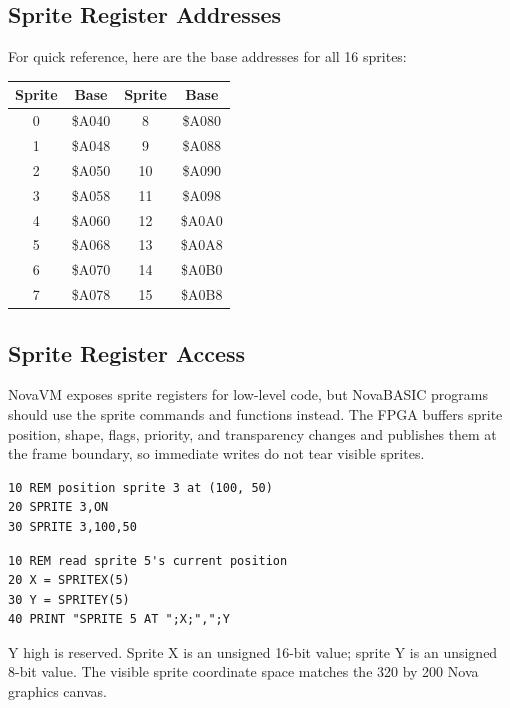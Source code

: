 \subsection*{Sprite Register Addresses}

For quick reference, here are the base addresses for all 16 sprites:

\begin{center}
\small
\begin{tabular}{@{}cccc@{}}
\toprule
\textbf{Sprite} & \textbf{Base} & \textbf{Sprite} & \textbf{Base} \\
\midrule
0  & \$A040 & 8  & \$A080 \\
1  & \$A048 & 9  & \$A088 \\
2  & \$A050 & 10 & \$A090 \\
3  & \$A058 & 11 & \$A098 \\
4  & \$A060 & 12 & \$A0A0 \\
5  & \$A068 & 13 & \$A0A8 \\
6  & \$A070 & 14 & \$A0B0 \\
7  & \$A078 & 15 & \$A0B8 \\
\bottomrule
\end{tabular}
\end{center}

\subsection*{Sprite Register Access}

NovaVM exposes sprite registers for low-level code, but NovaBASIC programs
should use the sprite commands and functions instead.  The FPGA buffers sprite
position, shape, flags, priority, and transparency changes and publishes them at
the frame boundary, so immediate writes do not tear visible sprites.

\begin{lstlisting}
10 REM position sprite 3 at (100, 50)
20 SPRITE 3,ON
30 SPRITE 3,100,50
\end{lstlisting}

\begin{lstlisting}
10 REM read sprite 5's current position
20 X = SPRITEX(5)
30 Y = SPRITEY(5)
40 PRINT "SPRITE 5 AT ";X;",";Y
\end{lstlisting}

\begin{notebox}
Y high is reserved.  Sprite X is an unsigned 16-bit value; sprite Y is an
unsigned 8-bit value.  The visible sprite coordinate space matches the
320 by 200 Nova graphics canvas.
\end{notebox}

